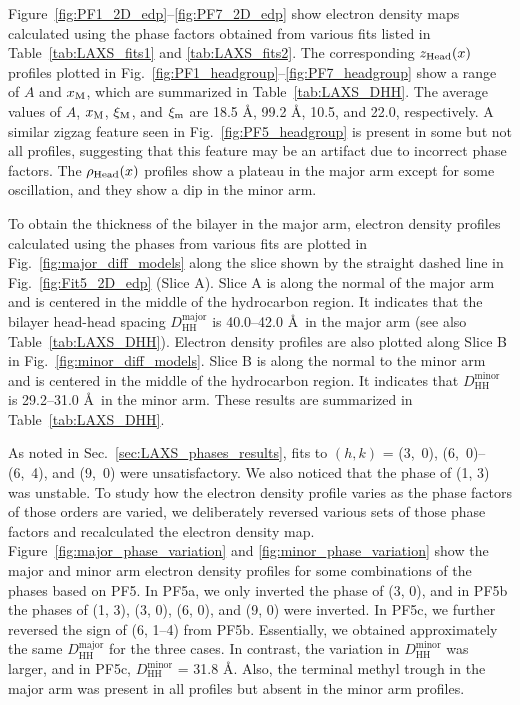Figure~\ref{fig:PF1_2D_edp}--\ref{fig:PF7_2D_edp} show electron density maps
calculated using the phase factors obtained from various fits listed in
Table~\ref{tab:LAXS_fits1} and \ref{tab:LAXS_fits2}. 
The corresponding $z_\text{Head}(x)$ profiles plotted in 
Fig.~\ref{fig:PF1_headgroup}--\ref{fig:PF7_headgroup} show a range of $A$ and $x_\textrm{M}$,
which are summarized in Table~\ref{tab:LAXS_DHH}.
The average values of $A$, $x_\textrm{M}$, $\xi_\text{M}$, and $\xi_\text{m}$ are 
18.5 \AA, 99.2 \AA, 10.5\textdegree, and 22.0\textdegree, respectively.
A similar zigzag feature seen in Fig.~\ref{fig:PF5_headgroup} is present
in some but not all profiles, suggesting that this feature may be an artifact 
due to incorrect phase factors.
The $\rho_\text{Head}(x)$ profiles show a plateau in the major arm except for some
oscillation, and they show a dip in the minor arm.

To obtain the thickness of the bilayer in the major arm, 
electron density profiles calculated
using the phases from various fits are 
plotted in Fig.~\ref{fig:major_diff_models} 
along the slice shown by the straight dashed line in Fig.~\ref{fig:Fit5_2D_edp}
(Slice A).
Slice A is along the normal of the major arm and is centered in the middle of 
the hydrocarbon region. It indicates that the bilayer head-head spacing 
$D_\text{HH}^\text{major}$ is 40.0--42.0 \AA\ in the major arm
(see also Table~\ref{tab:LAXS_DHH}). 
Electron density profiles are also plotted along Slice B
in Fig.~\ref{fig:minor_diff_models}.
Slice B is
along the normal to the minor arm and is centered in the middle of the
hydrocarbon region. It indicates that $D_\text{HH}^\text{minor}$ is
29.2--31.0 \AA\ in the minor arm.
These results are summarized in Table~\ref{tab:LAXS_DHH}.

As noted in Sec.~\ref{sec:LAXS_phases_results}, 
fits to $(h,k)$ = (3,~0), (6,~0)--(6,~4),
and (9,~0) were unsatisfactory. 
We also noticed that the phase of (1, 3) was unstable. 
To study how the electron density profile varies as the phase factors of those orders are varied,
we deliberately reversed various sets of those phase factors and recalculated the electron 
density map. Figure~\ref{fig:major_phase_variation}
and \ref{fig:minor_phase_variation} show the major and minor arm electron density
profiles for some combinations of the phases based on PF5. 
In PF5a, we only inverted the phase of (3, 0),
and in PF5b the phases of 
(1, 3), (3, 0), (6, 0), and (9, 0) were inverted.
In PF5c, we further reversed the sign of (6, 1--4) from PF5b.
Essentially, we obtained approximately the same $D_\text{HH}^\text{major}$
for the three cases. In contrast, the variation in $D_\text{HH}^\text{minor}$ was
larger, and in PF5c, $D_\text{HH}^\text{minor}$ = 31.8 \AA.
Also, the terminal methyl trough in the major arm was present in all profiles but
absent in the minor arm profiles.

